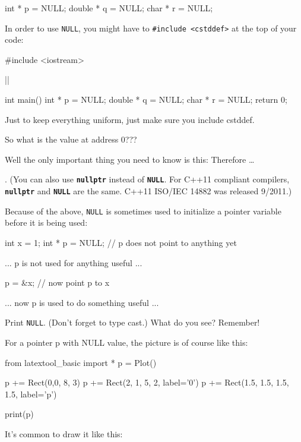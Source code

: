 \begin{consolethree}[escapeinside=||]
int * p = NULL;
double * q = NULL;
char * r = NULL;
\end{consolethree}

In order to use \texttt{NULL}, you might have to \texttt{\#include <cstddef>} at the top of your code:

\begin{consolethree}[escapeinside=||]
#include <iostream>

||

int main()
{
    int * p = NULL;
    double * q = NULL;
    char * r = NULL;
    return 0;
}
\end{consolethree}
Just to keep everything uniform, just make sure you include cstddef.

So what is the value at address 0???

Well the only important thing you need to know is this:  Therefore \ldots{}

. (You can also use \texttt{\textbf{nullptr}} instead of \texttt{\textbf{NULL}}. For C++11 compliant compilers, \texttt{\textbf{nullptr}} and \texttt{\textbf{NULL}} are the same. C++11 ISO/IEC 14882 was released 9/2011.)

Because of the above, \texttt{NULL} is sometimes used to initialize a pointer variable before it is being used:

\begin{consolethree}[escapeinside=||]
int x = 1;
int * p = NULL;   // p does not point to anything yet

... p is not used for anything useful ...

p = \&x;          // now point p to x

... now p is used to do something useful ...
\end{consolethree}

\begin{ex}
Print \texttt{NULL}. (Don't forget to type cast.) What do you see? Remember!

For a pointer p with NULL value, the picture is of course like this:
\begin{python}
from latextool_basic import *
p = Plot()

p += Rect(0,0, 8, 3)
p += Rect(2, 1, 5, 2, label='0')
p += Rect(1.5, 1.5, 1.5, 1.5, label='p')

print(p)
\end{python}
\end{ex}    
It's common to draw it like this:

